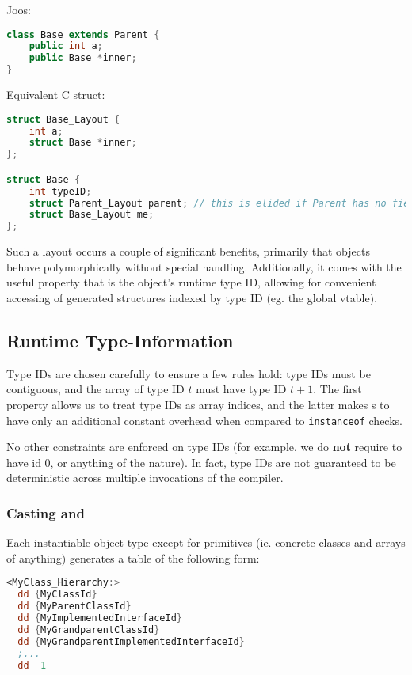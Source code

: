 \documentclass{article}
\begin{document}
Joos:
\begin{lstlisting}[language=java]
class Base extends Parent {
    public int a;
    public Base *inner;
}
\end{lstlisting}

Equivalent C struct:
\begin{lstlisting}[language=C++]
struct Base_Layout {
    int a;
    struct Base *inner;
};

struct Base {
    int typeID;
    struct Parent_Layout parent; // this is elided if Parent has no fields
    struct Base_Layout me;
};
\end{lstlisting}

Such a layout occurs a couple of significant benefits, primarily that objects behave polymorphically without special
handling. Additionally, it comes with the useful property that  is the object's runtime type ID,
allowing for convenient accessing of generated structures indexed by type ID (eg. the global vtable).



\subsection{Runtime Type-Information}
Type IDs are chosen carefully to ensure a few rules hold: type IDs must be contiguous, and the array of type ID $t$ must
have type ID $t + 1$. The first property allows us to treat type IDs as array indices, and the latter makes
s to have only an additional constant overhead when compared to \texttt{instanceof} checks.

No other constraints are enforced on type IDs (for example, we do \textbf{not} require  to have id 0, or
anything of the nature). In fact, type IDs are not guaranteed to be deterministic across multiple invocations of the
compiler.

\subsubsection{Casting and }
Each instantiable object type except for primitives (ie. concrete classes and arrays of anything) generates a table of
the following form:

\begin{lstlisting}[language=nasm]
<MyClass_Hierarchy:>
  dd {MyClassId}
  dd {MyParentClassId}
  dd {MyImplementedInterfaceId}
  dd {MyGrandparentClassId}
  dd {MyGrandparentImplementedInterfaceId}
  ;...
  dd -1
\end{lstlisting}
\end{document}
